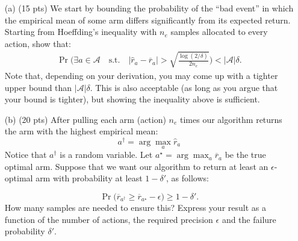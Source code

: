 \documentclass{article}
\begin{document}
\begin{enumerate}
\item[(a) (15 pts)] We start by bounding the probability of the ``bad event'' in which the empirical mean of some arm differs significantly from its expected return. Starting from Hoeffding's inequality with $n_e$ samples allocated to every action, show that:
\begin{align}
\Pr\Bigg(\exists a \in \mathcal{A} \quad \text{s.t.} \quad |\widehat r_a - \overline r_a | > \sqrt{\frac{\log(2/\delta)}{2n_e}}	\Bigg) < |\mathcal{A}|\delta.
\end{align}
Note that, depending on your derivation, you may come up with a tighter upper bound than $|\mathcal{A}|\delta$. This is also acceptable (as long as you argue that your bound is tighter), but showing the inequality above is sufficient.

\item[(b) (20 pts)] After pulling each arm (action) $n_e$ times our algorithm returns the arm with the highest empirical mean:
\begin{equation}
a^\dagger = \arg\max_{a} \widehat r_a
\end{equation}
Notice that $a^\dagger$ is a random variable.
Let ${a^\star} = \arg\max_a \overline r_{a}$ be the true optimal arm. Suppose that we want our algorithm to return at least an $\epsilon$-optimal arm with probability at least $1-\delta'$, as follows:

\begin{equation}
\Pr \Bigg(\overline r_{a^\dagger} \geq  \overline r_{a^\star} - \epsilon \Bigg) \geq 1-\delta'.
\end{equation}
How many samples are needed to ensure this? Express your result as a function of the number of actions, the required precision $\epsilon$ and the failure probability $\delta'$.
\end{enumerate}

\printbibliography
\end{document}
